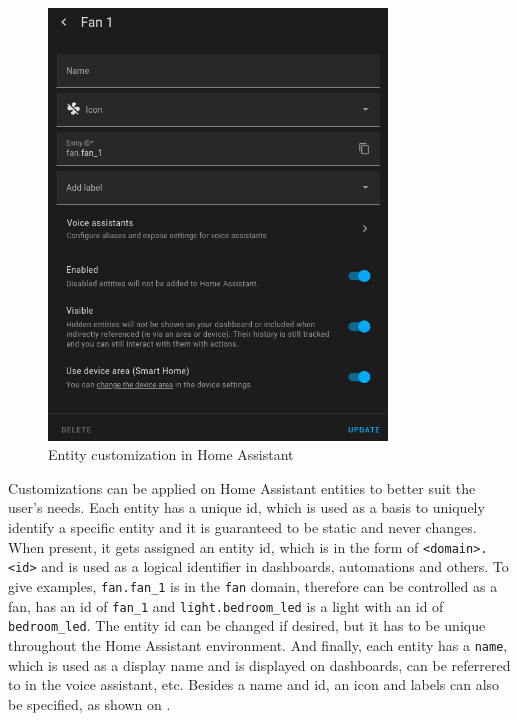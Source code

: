 \begin{figure}[!ht]
  \centering
  \includegraphics[width=90mm, keepaspectratio]{figures/homeassistant_entity_customization.png}
  \caption{Entity customization in Home Assistant}
  \label{fig:HAentityCustomization}
\end{figure}

Customizations can be applied on Home Assistant entities to better suit the user's needs. Each entity has a unique id, which is used as a basis to uniquely identify a specific entity and it is guaranteed to be static and never changes. \cite{HAFAQUniqueID} When present, it gets assigned an entity id, which is in the form of \verb+<domain>.<id>+ and is used as a logical identifier in dashboards, automations and others. \cite{HAEntitiesDomains} To give examples, \verb+fan.fan_1+ is in the \verb+fan+ domain, therefore can be controlled as a fan, has an id of \verb+fan_1+ and \verb+light.bedroom_led+ is a light with an id of \verb+bedroom_led+. The entity id can be changed if desired, but it has to be unique throughout the Home Assistant environment. And finally, each entity has a \verb+name+, which is used as a display name and is displayed on dashboards, can be referrered to in the voice assistant, etc. Besides a name and id, an icon and labels can also be specified, as shown on .


